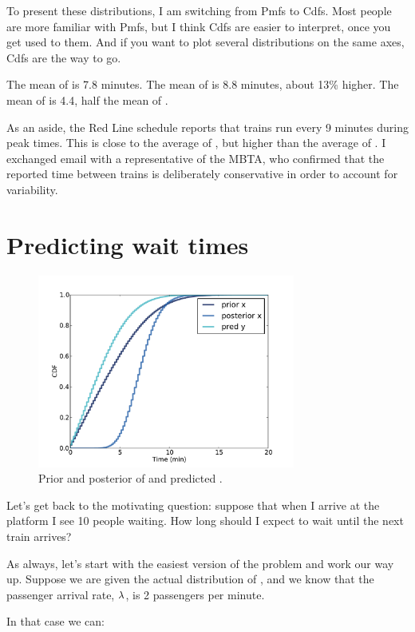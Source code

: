 \documentclass[12pt]{book}
\theoremstyle{exercise}
\begin{document}
To present these distributions, I am switching from Pmfs to Cdfs.
Most people are more familiar with Pmfs, but I think Cdfs are easier
to interpret, once you get used to them.  And if you want to plot
several distributions on the same axes, Cdfs are the way to go.

The mean of  is 7.8 minutes.  The mean of  is 8.8
minutes, about 13\% higher.  The mean of  is 4.4, half
the mean of .

As an aside, the Red Line schedule reports that trains run every
9 minutes during peak times.  This is close to the average of
, but higher than the average of .  I exchanged email
with a representative of the MBTA, who confirmed that the reported
time between trains is deliberately conservative in order to
account for variability.


\section{Predicting wait times}
\label{elapsed}

\begin{figure}
\centerline{\includegraphics[height=2.5in]{figs/redline3.pdf}}
\caption{Prior and posterior of  and predicted . }
\label{fig.redline3}
\end{figure}

Let's get back to the motivating question: suppose that when
I arrive at the platform I see 10 people waiting.
How long should I expect to wait until the next train arrives?

As always, let's start with the easiest version of the problem
and work our way up.  Suppose we are given the actual distribution of
, and we know that the passenger arrival rate,
$\mathtt{\lambda}$, is 2 passengers per minute.

In that case we can:
\end{document}
